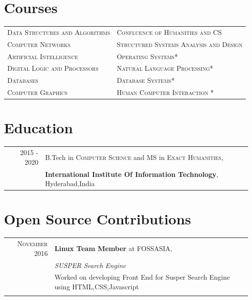\documentclass[a4paper,10pt]{article}
\begin{document}
\section{Courses}
\begin{tabular}{ll}	
\textsc{Data Structures and Algorithms} &\textsc{Confluence of Humanities and CS} \\
\textsc{Computer Networks}  &\textsc{Structured Systems Analysis and Design}\\
\textsc{Artificial Intelligence} &\textsc{Operating Systems*}\\
\textsc{Digital Logic and Processors} &\textsc{Natural Language Processing*}\\
\textsc{Databases} &\textsc{Database Systems*}\\
\textsc{Computer Graphics} &\textsc{Human Computer Interaction} *\\


\end{tabular}

\section{Education}
\begin{tabular}{rl}	
 \textsc{2015 - 2020} & B.Tech in  \textsc{Computer Science} and MS in \textsc{Exact Humanities},\\ 
 & \textbf{International Institute Of Information Technology}, Hyderabad,India\\
\end{tabular}


\section{Open Source Contributions}
\begin{tabular}{rl}	
 \textsc{November} 2016 & \textbf{Linux Team Member} at \textsc{FOSSASIA}, \\
&  \small\emph{SUSPER Search Engine}\\
&  \footnotesize{Worked on developing Front End for Susper Search Engine using HTML,CSS,Javascript}\\\\


\end{tabular}


\end{document}
